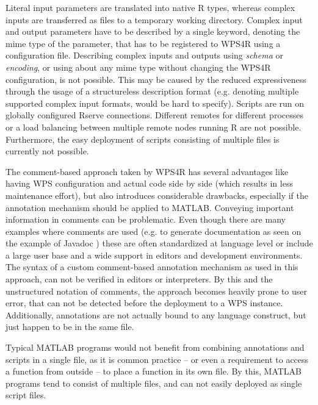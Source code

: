 Literal input parameters are translated into native R types, whereas complex inputs are transferred as files to a temporary working directory. Complex input and output parameters have to be described by a single keyword, denoting the mime type of the parameter, that has to be registered to WPS4R using a configuration file. Describing complex inputs and outputs using \emph{schema} or \emph{encoding}, or using about any mime type without changing the WPS4R configuration, is not possible. This may be caused by the reduced expressiveness through the usage of a structureless description format (e.g. denoting multiple supported complex input formats, would be hard to specify). Scripts are run on globally configured Rserve connections. Different remotes for different processes or a load balancing between multiple remote nodes running R are not possible. Furthermore, the easy deployment of scripts consisting of multiple files is currently not possible.

The comment-based approach taken by WPS4R has several advantages like having \ac{WPS} configuration and actual code side by side (which results in less maintenance effort), but also introduces considerable drawbacks, especially if the annotation mechanism should be applied to MATLAB. Conveying important information in comments can be problematic. Even though there are many examples where comments are used (e.g. to generate documentation as seen on the example of Javadoc \citep{javadoc}) these are often standardized at language level or include a large user base and a wide support in editors and development environments. The syntax of a custom comment-based annotation mechanism as used in this approach, can not be verified in editors or interpreters. By this and the unstructured notation of comments, the approach becomes heavily prone to user error, that can not be detected before the deployment to a WPS instance. Additionally, annotations are not actually bound to any language construct, but just happen to be in the same file.

Typical MATLAB programs would not benefit from combining annotations and scripts in a single file, as it is common practice -- or even a requirement to access a function from outside -- to place a function in its own file. By this, MATLAB programs tend to consist of multiple files, and can not easily deployed as single script files.

